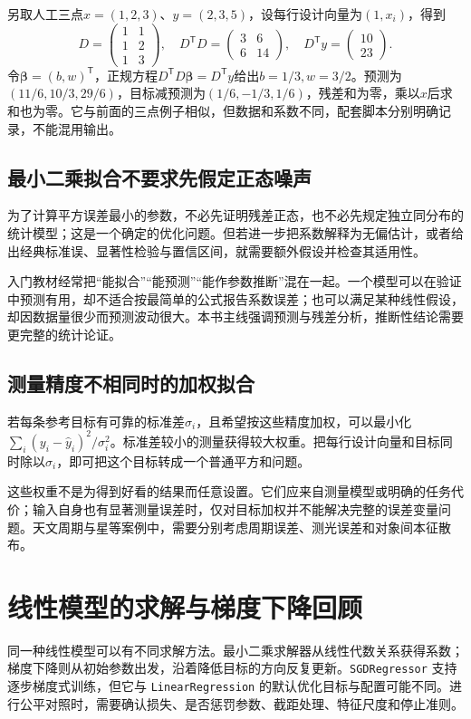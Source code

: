 另取人工三点$x=(1,2,3)$、$y=(2,3,5)$，设每行设计向量为$(1,x_i)$，得到
\[
D=\begin{pmatrix}1&1\\1&2\\1&3\end{pmatrix},\quad
D^{\mathsf T}D=\begin{pmatrix}3&6\\6&14\end{pmatrix},\quad
D^{\mathsf T}y=\begin{pmatrix}10\\23\end{pmatrix}.
\]
令$\boldsymbol\beta=(b,w)^{\mathsf T}$，正规方程$D^{\mathsf T}D\boldsymbol\beta=D^{\mathsf T}y$给出$b=1/3,w=3/2$。预测为$(11/6,10/3,29/6)$，目标减预测为$(1/6,-1/3,1/6)$，残差和为零，乘以$x$后求和也为零。它与前面的三点例子相似，但数据和系数不同，配套脚本分别明确记录，不能混用输出。

\subsection{最小二乘拟合不要求先假定正态噪声}
为了计算平方误差最小的参数，不必先证明残差正态，也不必先规定独立同分布的统计模型；这是一个确定的优化问题。但若进一步把系数解释为无偏估计，或者给出经典标准误、显著性检验与置信区间，就需要额外假设并检查其适用性。

入门教材经常把“能拟合”“能预测”“能作参数推断”混在一起。一个模型可以在验证中预测有用，却不适合按最简单的公式报告系数误差；也可以满足某种线性假设，却因数据量很少而预测波动很大。本书主线强调预测与残差分析，推断性结论需要更完整的统计论证。

\subsection{测量精度不相同时的加权拟合}
若每条参考目标有可靠的标准差$\sigma_i$，且希望按这些精度加权，可以最小化$\sum_i(y_i-\hat y_i)^2/\sigma_i^2$。标准差较小的测量获得较大权重。把每行设计向量和目标同时除以$\sigma_i$，即可把这个目标转成一个普通平方和问题。

这些权重不是为得到好看的结果而任意设置。它们应来自测量模型或明确的任务代价；输入自身也有显著测量误差时，仅对目标加权并不能解决完整的误差变量问题。天文周期与星等案例中，需要分别考虑周期误差、测光误差和对象间本征散布。

\section{线性模型的求解与梯度下降回顾}
同一种线性模型可以有不同求解方法。最小二乘求解器从线性代数关系获得系数；梯度下降则从初始参数出发，沿着降低目标的方向反复更新。\texttt{SGDRegressor} 支持逐步梯度式训练，但它与 \texttt{LinearRegression} 的默认优化目标与配置可能不同。进行公平对照时，需要确认损失、是否惩罚参数、截距处理、特征尺度和停止准则。

